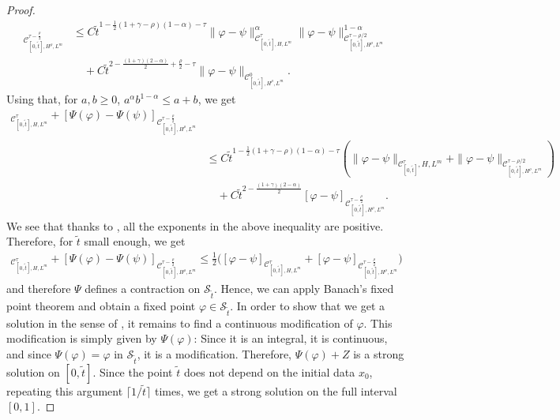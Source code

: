 \documentclass[11pt,a4paper]{article}
\newcommand{\cC}{\mathcal{C}}
\renewcommand{\phi}{\varphi}
\renewcommand{\le}{\leqslant}
\numberwithin{equation}{section}
\let\cref\crtcref
\theoremstyle{definition}
\theoremstyle{remark}
\theoremstyle{plain}
\begin{document}
\begin{proof}
\begin{align*}
[\Psi(\phi)-\Psi(\psi)]_{\mathcal{C}^{\tau-\frac{\rho}{2}}_{[0,\tilde{t}],H^\rho,L^m}}&\le C {\tilde{t}}^{1-\frac12 (1+\gamma-\rho)(1-\alpha)-\tau}\|\phi-\psi\|_{\cC^\tau_{[0,\tilde{t}],H,L^m}}^{\alpha}\|\phi-\psi\|_{\cC^{\tau-\rho/2}_{[0,\tilde{t}],H^
\rho,L^m}}^{1-\alpha}\nonumber\\
&\quad +C  {\tilde{t}}^{2-\frac{(1+\gamma)(2-\alpha)}{2}+\frac\rho2-\tau}  \|\phi-\psi\|_{\cC^0_{[0,\tilde{t}],H^\rho,L^m}}.
\end{align*}
Using that, for $a,b\geqslant 0$, $a^\alpha b^{1-\alpha}\leqslant a+b$, we get
\begin{align*}
    [\Psi(\phi)-\Psi&(\psi)]_{\mathcal{C}^{\tau}_{[0,\tilde{t}],H,L^m}}+[\Psi(\phi)-\Psi(\psi)]_{\mathcal{C}^{\tau-\frac{\rho}{2}}_{[0,\tilde{t}],H^\rho,L^m}}\\
    &\leqslant C {\tilde{t}}^{1-\frac12 (1+\gamma-\rho)(1-\alpha)-\tau}(\|\phi-\psi\|_{\cC^\tau_{[0,\tilde{t}]},H,L^m}+\|\phi-\psi\|_{\cC^{\tau-\rho/2}_{[0,\tilde{t}],H^
\rho,L^m}})\nonumber\\
&\quad +C  {\tilde{t}}^{2-\frac{(1+\gamma)(2-\alpha)}{2}}  [\phi-\psi]_{\cC^{\tau-\frac{\rho}{2}}_{[0,\tilde{t}],H^\rho,L^m}}.
\end{align*}
We see that thanks to \cref{a:manyineq}, all the exponents in the above inequality are positive. Therefore, for $\tilde{t}$ small enough, we get 
\begin{align*}
    [\Psi(\phi)-\Psi(\psi)]_{\mathcal{C}^{\tau}_{[0,\tilde{t}],H,L^m}}+[\Psi(\phi)-\Psi(\psi)]_{\mathcal{C}^{\tau-\frac{\rho}{2}}_{[0,\tilde{t}],H^\rho,L^m}}\leqslant \frac{1}{2}\Big([\phi-\psi]_{\mathcal{C}^{\tau}_{[0,\tilde{t}],H,L^m}}+[\phi-\psi]_{\mathcal{C}^{\tau-\frac{\rho}{2}}_{[0,\tilde{t}],H^\rho,L^m}}\Big)
\end{align*}
and therefore $\Psi$ defines a contraction on $\mathcal{S}_{\tilde{t}}$. Hence, we can apply Banach's fixed point theorem and obtain a fixed point $\phi\in\mathcal{S}_{\tilde{t}}$.
In order to show that we get a solution in the sense of \cref{def:sol}, it remains to find a continuous modification of $\varphi$. This modification is simply given by $\Psi(\varphi)$: Since it is an integral, it is continuous, and since $\Psi(\varphi)=\varphi$ in $\mathcal{S}_{\tilde{t}}$, it is a modification. Therefore, $\Psi(\varphi)+Z$ is a strong solution on $[0,\tilde{t}]$.
Since the point $\tilde{t}$ does not depend on the initial data $x_0$, repeating this argument $\lceil 1/\tilde{t}\rceil$ times, we get a strong solution on the full interval $[0,1]$.
\end{proof}
\end{document}

